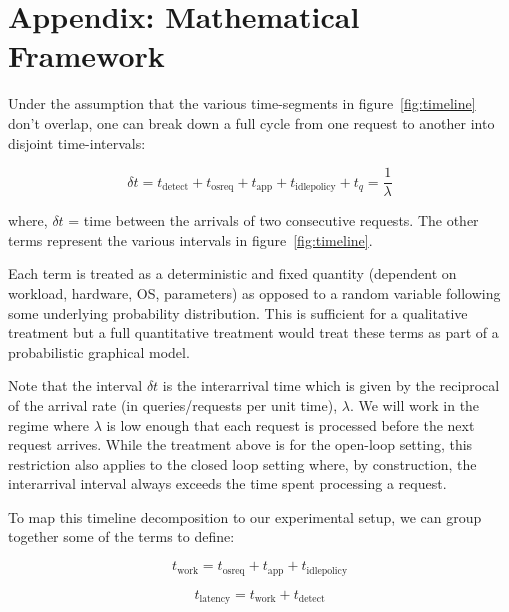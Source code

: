 

\newpage
\section{\bf{Appendix:}  Mathematical Framework}
\label{sec:appendix}

Under the assumption that the various time-segments in figure~\ref{fig:timeline} don't overlap, one can break down a full cycle from one request to another into disjoint time-intervals:

\begin{equation}
\delta t = t_{\text{detect}} + t_{\text{osreq}} + t_{\text{app}} + t_{\text{idlepolicy}} + t_q = \frac{1}{\lambda}
\label{eq:time}
\end{equation}

where, $\delta t$ = time between the arrivals of two consecutive requests. The other terms represent the various intervals in figure~\ref{fig:timeline}.

Each term is treated as a deterministic and fixed quantity (dependent on workload, hardware, OS, parameters) as opposed to a random variable following some underlying probability distribution. This is sufficient for a qualitative treatment but a full quantitative treatment would treat these terms as part of a probabilistic graphical model.

Note that the interval $\delta t$ is the interarrival time which is given by the reciprocal of the arrival rate (in queries/requests per unit time), $\lambda$. We will work in the regime where $\lambda$ is low enough that each request is processed before the next request arrives. While the treatment above is for the open-loop setting, this restriction also applies to the closed loop setting where, by construction, the interarrival interval always exceeds the time spent processing a request.

To map this timeline decomposition to our experimental setup, we can group together some of the terms to define:

$$t_{\text{work}} = t_{\text{osreq}} + t_{\text{app}} + t_{\text{idlepolicy}}$$

$$t_{\text{latency}} = t_{\text{work}} + t_{\text{detect}}$$

